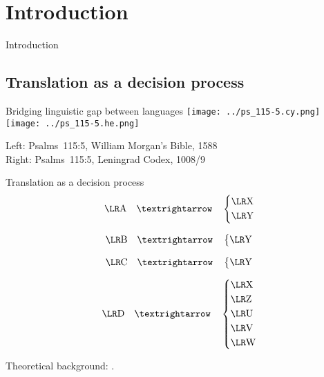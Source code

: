\setcounter{section}{-1}
\section{Introduction}

\begin{frame}{}
	\begin{center}
		Introduction
	\end{center}
\end{frame}



\subsection{Translation as a decision process}

\begin{frame}{Bridging linguistic gap between languages}
	\texttt{[image: ../ps\_115-5.cy.png]}
	\hfill
	\texttt{[image: ../ps\_115-5.he.png]}

	\vfill

	Left: Psalms~115:5, William Morgan’s Bible, 1588\\
	Right: Psalms~115:5, Leningrad Codex, 1008/9
\end{frame}



\begin{frame}{\hopoint Translation as a decision process}
	$$
	\mtext{A} \transto
	\begin{dcases}
		\mtext{X}\\
		\mtext{Y}
	\end{dcases}
	$$

	$$
	\mtext{B} \transto
	\begin{dcases}
		\mtext{Y}
	\end{dcases}
	$$

	$$
	\mtext{C} \transto
	\begin{dcases}
		\mtext{Y}
	\end{dcases}
	$$

	$$
	\mtext{D} \transto
	\begin{dcases}
		\mtext{X}\\
		\mtext{Z}\\
		\mtext{U}\\
		\mtext{V}\\
		\mtext{W}
	\end{dcases}
	$$

	Theoretical background: \cite{levy.j:1967:translation}.
\end{frame}



